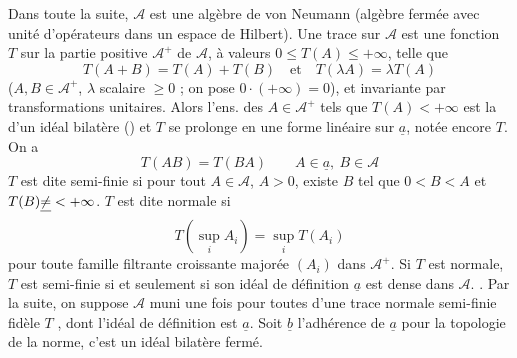 \documentclass[11pt,a4paper]{article}
\begin{document}
Dans toute la suite, $\mathcal{A}$ est une algèbre de von Neumann (algèbre   fermée  avec unité d'opérateurs dans un espace de Hilbert).  Une trace \struck{\ill{}} sur $\mathcal{A}$ est une  fonction $T$ sur la partie positive $\mathcal{A}^{+}$ de $\mathcal{A}$, à valeurs $0 \leq T(A) \leq +\infty$,  telle que
\[
  T(A+B) = T(A) + T(B) \quad\text{et}\quad T(\lambda A) = \lambda T(A)
\]
($A, B \in \mathcal{A}^{+}$, $\lambda$ scalaire $\geq 0$ ; on pose $0\cdot(+\infty) = 0$), et invariante par transformations unitaires. Alors l'ens. des $A \in \mathcal{A}^{+}$ tels que $T(A) < +\infty$ est la   d'un idéal bilatère  () et $T$ se prolonge en une forme linéaire sur $\underline{a}$, notée encore $T$. On a
\[
  T(AB) = T(BA) \qquad A \in \underline{a},\ B \in \mathcal{A}
\]
$T$ est dite  semi-finie si pour tout  $A \in \mathcal{A}$, $A > 0$, existe $B$ tel que $0 < B < A$ et $T(B) \struck{\neq} < +\infty$. $T$ est dite normale si
\[
  T(\textstyle\sup_i A_i) = \sup_i T(A_i)
\]
pour toute famille filtrante croissante majorée $(A_i)$ dans $\mathcal{A}^{+}$. Si $T$ est normale, $T$ est  semi-finie  si et seulement si \struck{\ill{}} son idéal de définition $\underline{a}$ est  dense dans $\mathcal{A}$.  . Par la suite, on suppose $\mathcal{A}$ muni une fois pour toutes d'une trace normale semi-finie fidèle $T$ , dont l'idéal de définition est $\underline{a}$. Soit $\underline{b}$ l'adhérence de $\underline{a}$ pour la topologie de la norme, c'est un idéal bilatère   fermé.

\end{document}
